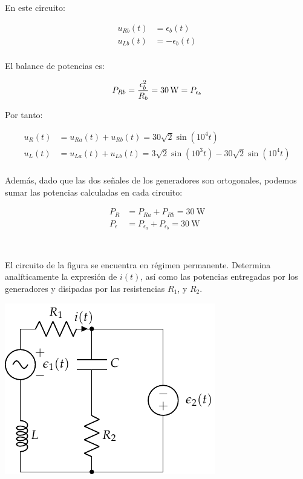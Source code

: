 \documentclass[12pt]{article}
\begin{document}
En este circuito:

\begin{align*}
  u_{Rb}(t) &= \epsilon_b(t)\\
  u_{Lb}(t) &= -\epsilon_b(t)\\  
\end{align*}

El balance de potencias es:

\begin{equation*}
  P_{Rb} = \frac{\epsilon_b^2}{R_b} = \SI{30}{\watt} = P_{\epsilon_b}\\
\end{equation*}

Por tanto:

\begin{align*}
  u_R(t) &= u_{Ra}(t) + u_{Rb}(t) = 30\sqrt{2}\sin(10^4 t)\\
  u_L(t) &= u_{La}(t) + u_{Lb}(t) = 3\sqrt{2}\sin(10^3 t) - 30\sqrt{2}\sin(10^4 t)\\
\end{align*}

Además, dado que las dos señales de los generadores son ortogonales, podemos sumar las potencias calculadas en cada circuito:

\begin{align*}
  P_R &= P_{Ra} + P_{Rb} = \SI{30}{\watt}\\
  P_\epsilon &= P_{\epsilon_a} + P_{\epsilon_b} = \SI{30}{\watt}\\
\end{align*}

\clearpage

\section{}

El circuito de la figura se encuentra en régimen permanente. Determina
analíticamente la expresión de $i(t)$, así como las potencias entregadas por los
generadores y disipadas por las resistencias $R_1$, y $R_2$.
\begin{center}
\includegraphics{../figs/superposicion1}
\end{center}
\end{document}
